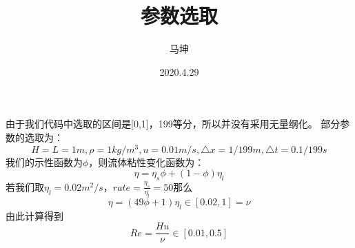\documentclass[11pt,UTF8]{ctexart}
\title{参数选取}
\author{马坤}
\date{2020.4.29}
\begin{document}
    \maketitle
    \par{由于我们代码中选取的区间是[0,1]，199等分，所以并没有采用无量纲化。
    部分参数的选取为：
    $$
    H = L = 1m,\rho = 1 kg/m^3,u = 0.01m/s,
    \triangle x=1/199  m,\triangle t = 0.1/199s
    $$
    我们的示性函数为$\phi$，则流体粘性变化函数为：
    $$
    \eta = \eta_s\phi+(1-\phi)\eta_l
    $$
    若我们取$\eta_l=0.02m^2/s$，$rate=\frac{\eta_s}{\eta_l}=50$那么
    $$\eta=(49\phi+1)\eta_l\in[0.02,1]=\nu$$
    由此计算得到
    $$Re = \frac{Hu}{\nu}\in [0.01,0.5]$$}
\end{document}
